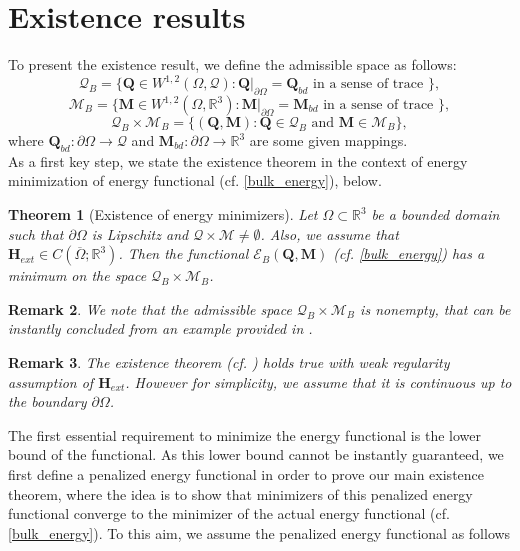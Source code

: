 \documentclass{article}
\newtheorem{theorem}{Theorem}[section]
\newtheorem{remark}[theorem]{Remark}
\def\Qvec{\mathbf{Q}}
\def \Mvec{\mathbf{M}}
\def\Hvec{\mathbf{H}}
\begin{document}
\section{Existence results}\label{existence results}
To present the existence result, we define the admissible space as follows:
\begin{displaymath}
\mathcal{Q}_{B} = \Big \{ \Qvec \in W^{1,2} \left(\Omega, \mathcal{Q}\right):  \Qvec|_{\partial \Omega} = \Qvec_{bd} \mbox{ in a sense of trace }\Big \},
\end{displaymath}
\begin{displaymath}
\mathcal{M}_{B} = \Big \{ \Mvec \in W^{1,2} \left( \Omega, \mathbb R^3 \right) : \Mvec|_{\partial \Omega} = \Mvec_{bd} \mbox{ in a sense of trace }\Big \},
\end{displaymath}
\begin{displaymath}
\mathcal{Q}_{B}\times\mathcal{M}_{B} = \Big \{ \left(\Qvec, \Mvec\right) : \Qvec \in \mathcal{Q}_{B} \mbox{ and } \Mvec \in \mathcal{M}_{B} \Big \},
\end{displaymath}
where $\Qvec_{bd}: \partial\Omega\rightarrow\mathcal{Q}$ and $\Mvec_{bd}: \partial\Omega\rightarrow\mathbb R^3$ are some given mappings.\newline\\
As a first key step, we state the existence theorem in the context of energy minimization of energy functional (cf. \eqref{bulk_energy}), below.
\begin{theorem}[Existence of energy minimizers]\label{thm:1}
Let $\Omega\subset\mathbb R^3$ be a bounded domain such that $\partial\Omega$ is Lipschitz and $\mathcal{Q}\times\mathcal{M}\ne\emptyset$. Also, we assume that $\Hvec_{ext}\in C\left(\overline{\Omega}; \mathbb R^3\right)$. Then the functional $\mathcal{E}_{B}\left(\Qvec, \Mvec\right)$ (cf. \eqref{bulk_energy}) has a minimum on the space $\mathcal{Q}_B\times\mathcal{M}_B$.
\end{theorem}
\begin{remark}
We note that the admissible space $\mathcal{Q}_B\times\mathcal{M}_B$ is nonempty, that can be instantly concluded from an example provided in \cite{bethuel1994ginzburg}.
\end{remark}
\begin{remark}
The existence theorem (cf. ) holds true with weak regularity assumption of $\Hvec_{ext}$. However for simplicity, we assume that it is continuous up to the boundary $\partial\Omega$.
\end{remark}
The first essential requirement to minimize the energy functional is the lower bound of the functional. As this lower bound cannot be instantly guaranteed, we first define a penalized energy functional in order to prove our main existence theorem, where the idea is to show that minimizers of this penalized energy functional converge to the minimizer of the actual energy functional (cf. \eqref{bulk_energy}). To this aim, we assume the penalized energy functional as follows
\end{document}
